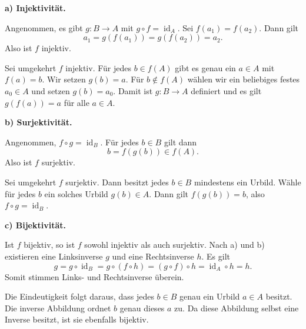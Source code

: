 

\begin{myproof}
\textbf{a) Injektivität.}

Angenommen, es gibt \(g\colon B\to A\) mit \(g\circ f=\operatorname{id}_A\). Sei \(f(a_1)=f(a_2)\). Dann gilt
\[
a_1=g(f(a_1))=g(f(a_2))=a_2.
\]
Also ist \(f\) injektiv.

Sei umgekehrt \(f\) injektiv. Für jedes \(b\in f(A)\) gibt es genau ein \(a\in A\) mit \(f(a)=b\). Wir setzen \(g(b)=a\). Für \(b\notin f(A)\) wählen wir ein beliebiges festes \(a_0\in A\) und setzen \(g(b)=a_0\). Damit ist \(g\colon B\to A\) definiert und es gilt \(g(f(a))=a\) für alle \(a\in A\).

\textbf{b) Surjektivität.}

Angenommen, \(f\circ g=\operatorname{id}_B\). Für jedes \(b\in B\) gilt dann
\[
b=f(g(b))\in f(A).
\]
Also ist \(f\) surjektiv.

Sei umgekehrt \(f\) surjektiv. Dann besitzt jedes \(b\in B\) mindestens ein Urbild. Wähle für jedes \(b\) ein solches Urbild \(g(b)\in A\). Dann gilt \(f(g(b))=b\), also \(f\circ g=\operatorname{id}_B\).

\textbf{c) Bijektivität.}

Ist \(f\) bijektiv, so ist \(f\) sowohl injektiv als auch surjektiv. Nach a) und b) existieren eine Linksinverse \(g\) und eine Rechtsinverse \(h\). Es gilt
\[
g=g\circ\operatorname{id}_B
=g\circ(f\circ h)
=(g\circ f)\circ h
=\operatorname{id}_A\circ h=h.
\]
Somit stimmen Links- und Rechtsinverse überein.

Die Eindeutigkeit folgt daraus, dass jedes \(b\in B\) genau ein Urbild \(a\in A\) besitzt. Die inverse Abbildung ordnet \(b\) genau dieses \(a\) zu. Da diese Abbildung selbst eine Inverse besitzt, ist sie ebenfalls bijektiv.
\end{myproof}

